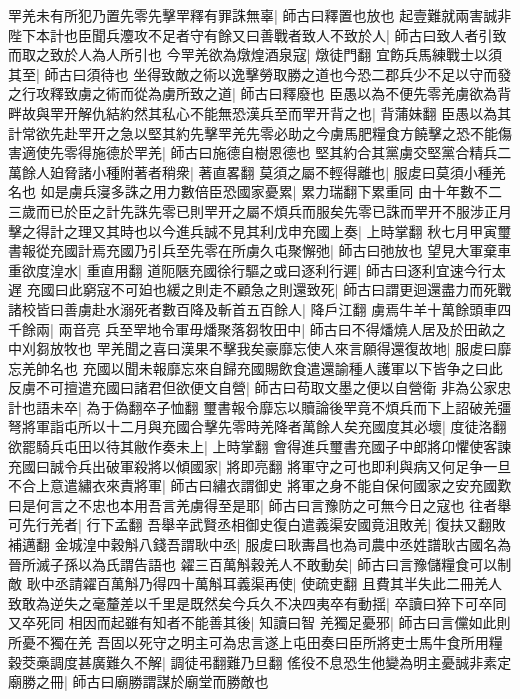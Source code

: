 䍐羌未有所犯乃置先零先擊䍐釋有罪誅無辜|{
	師古曰釋置也放也}
起壹難就兩害誠非陛下本計也臣聞兵灋攻不足者守有餘又曰善戰者致人不致於人|{
	師古曰致人者引致而取之致於人為人所引也}
今䍐羌欲為燉煌酒泉寇|{
	燉徒門翻}
宜飭兵馬練戰士以須其至|{
	師古曰須待也}
坐得致敵之術以逸擊勞取勝之道也今恐二郡兵少不足以守而發之行攻釋致虜之術而從為虜所致之道|{
	師古曰釋廢也}
臣愚以為不便先零羌虜欲為背畔故與䍐开解仇結約然其私心不能無恐漢兵至而䍐开背之也|{
	背蒲妹翻}
臣愚以為其計常欲先赴䍐开之急以堅其約先擊䍐羌先零必助之今虜馬肥糧食方饒擊之恐不能傷害適使先零得施德於䍐羌|{
	師古曰施德自樹恩德也}
堅其約合其黨虜交堅黨合精兵二萬餘人廹脅諸小種附著者稍衆|{
	著直畧翻}
莫須之屬不輕得離也|{
	服䖍曰莫須小種羌名也}
如是虜兵寖多誅之用力數倍臣恐國家憂累|{
	累力瑞翻下累重同}
由十年數不二三歲而已於臣之計先誅先零已則䍐开之屬不煩兵而服矣先零已誅而䍐开不服涉正月擊之得計之理又其時也以今進兵誠不見其利戊申充國上奏|{
	上時掌翻}
秋七月甲寅璽書報從充國計焉充國乃引兵至先零在所虜久屯聚懈弛|{
	師古曰弛放也}
望見大軍棄車重欲度湟水|{
	重直用翻}
道阨陿充國徐行驅之或曰逐利行遲|{
	師古曰逐利宜速今行太遅}
充國曰此窮寇不可廹也緩之則走不顧急之則還致死|{
	師古曰謂更迴還盡力而死戰}
諸校皆曰善虜赴水溺死者數百降及斬首五百餘人|{
	降戶江翻}
虜焉牛羊十萬餘頭車四千餘兩|{
	兩音亮}
兵至䍐地令軍毋燔聚落芻牧田中|{
	師古曰不得燔燒人居及於田畝之中刈芻放牧也}
䍐羌聞之喜曰漢果不擊我矣豪靡忘使人來言願得還復故地|{
	服䖍曰靡忘羌帥名也}
充國以聞未報靡忘來自歸充國賜飲食遣還諭種人護軍以下皆争之曰此反虜不可擅遣充國曰諸君但欲便文自營|{
	師古曰苟取文墨之便以自營衛}
非為公家忠計也語未卒|{
	為于偽翻卒子恤翻}
璽書報令靡忘以贖論後䍐竟不煩兵而下上詔破羌彊弩將軍詣屯所以十二月與充國合擊先零時羌降者萬餘人矣充國度其必壞|{
	度徒洛翻}
欲罷騎兵屯田以待其敝作奏未上|{
	上時掌翻}
會得進兵璽書充國子中郎將卬懼使客諫充國曰誠令兵出破軍殺將以傾國家|{
	將即亮翻}
將軍守之可也即利與病又何足争一旦不合上意遣繡衣來責將軍|{
	師古曰繡衣謂御史}
將軍之身不能自保何國家之安充國歎曰是何言之不忠也本用吾言羌虜得至是耶|{
	師古曰言豫防之可無今日之寇也}
往者舉可先行羌者|{
	行下孟翻}
吾舉辛武賢丞相御史復白遣義渠安國竟沮敗羌|{
	復扶又翻敗補邁翻}
金城湟中穀斛八錢吾謂耿中丞|{
	服䖍曰耿夀昌也為司農中丞姓譜耿古國名為晉所滅子孫以為氏謂告語也}
糴三百萬斛穀羌人不敢動矣|{
	師古曰言豫儲糧食可以制敵}
耿中丞請糴百萬斛乃得四十萬斛耳義渠再使|{
	使疏吏翻}
且費其半失此二冊羌人致敢為逆失之毫釐差以千里是既然矣今兵久不决四夷卒有動揺|{
	卒讀曰猝下可卒同又卒死同}
相因而起雖有知者不能善其後|{
	知讀曰智}
羌獨足憂邪|{
	師古曰言儻如此則所憂不獨在羌}
吾固以死守之明主可為忠言遂上屯田奏曰臣所將吏士馬牛食所用糧穀茭槀調度甚廣難久不解|{
	調徒弔翻難乃旦翻}
傜役不息恐生他變為明主憂誠非素定廟勝之冊|{
	師古曰廟勝謂謀於廟堂而勝敵也}

